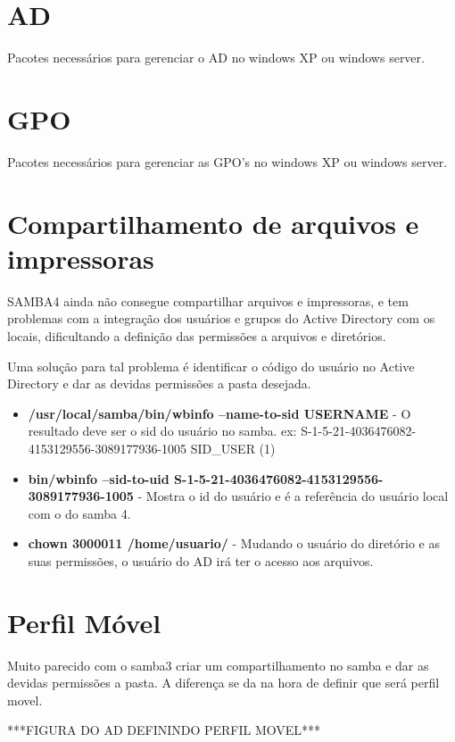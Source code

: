 \section{AD}

Pacotes necessários para gerenciar o AD no windows XP ou windows server.

\section{GPO}

Pacotes necessários para gerenciar as GPO's no windows XP ou windows server.

\section{Compartilhamento de arquivos e impressoras}

SAMBA4 ainda não consegue compartilhar arquivos e impressoras, e tem problemas com a integração dos usuários e grupos do Active Directory com os locais, dificultando a definição das permissões a arquivos e diretórios.

Uma solução para tal problema é identificar o código do usuário no Active Directory e dar as devidas permissões a pasta desejada.

\begin{itemize}
	\item \textbf{/usr/local/samba/bin/wbinfo --name-to-sid USERNAME} - O resultado deve ser o sid do usuário no samba. ex: S-1-5-21-4036476082-4153129556-3089177936-1005 SID_USER (1)
	\item \textbf{bin/wbinfo --sid-to-uid S-1-5-21-4036476082-4153129556-3089177936-1005} - Mostra o id do usuário e é a referência do usuário local com o do samba 4.
	\item \textbf{chown 3000011 /home/usuario/} - Mudando o usuário do diretório e as suas permissões, o usuário do AD irá ter o acesso aos arquivos.
\end{itemize} 

\section{Perfil Móvel}

Muito parecido com o samba3 criar um compartilhamento no samba e dar as devidas permissões a pasta. A diferença se da na hora de definir que será perfil movel.

***FIGURA DO AD DEFININDO PERFIL MOVEL***


